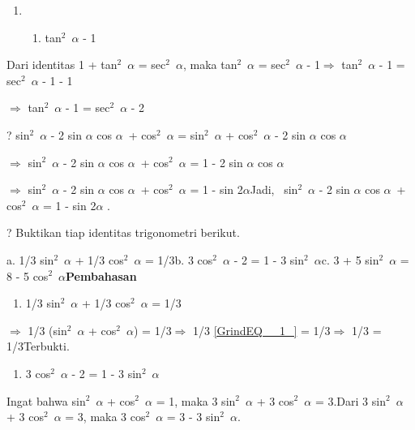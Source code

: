 \documentclass[11pt,fleqn]{book} %
\begin{document}
\begin{myEnumerate}
\begin{itemize}
\begin{enumerate}
\item \begin{enumerate}
\item  tan${}^{2}$~$\alpha$ - 1
\end{enumerate}
\end{enumerate}

\noindent Dari identitas 1 + tan${}^{2}$~$\alpha$ = sec${}^{2}$~$\alpha$, maka tan${}^{2}$~$\alpha$ = sec${}^{2}$~$\alpha$ - 1$\mathrm{\Rightarrow }$ tan${}^{2}$~$\alpha$ - 1 = sec${}^{2}$~$\alpha$ - 1 - 1

\noindent $\mathrm{\Rightarrow }$ tan${}^{2}$~$\alpha$ - 1 = sec${}^{2}$~$\alpha$ - 2 

\noindent ?  sin${}^{2}$~$\alpha$ - 2 sin $\alpha$ cos $\alpha$~+ cos${}^{2}$~$\alpha$ = sin${}^{2}$~$\alpha$ + cos${}^{2}$~$\alpha$ - 2 sin $\alpha$ cos $\alpha$

\noindent $\mathrm{\Rightarrow }$ sin${}^{2}$~$\alpha$ - 2 sin $\alpha$ cos $\alpha$~+ cos${}^{2}$~$\alpha$ = 1 - 2 sin $\alpha$ cos $\alpha$

\noindent $\mathrm{\Rightarrow }$ sin${}^{2}$~$\alpha$ - 2 sin $\alpha$ cos $\alpha$~+ cos${}^{2}$~$\alpha$ = 1 - sin 2$\alpha$Jadi,~ sin${}^{2}$~$\alpha$ - 2 sin $\alpha$ cos $\alpha$~+ cos${}^{2}$~$\alpha$ = 1 - sin 2$\alpha$ .

\noindent 

\noindent ?  Buktikan tiap identitas trigonometri berikut.

\noindent a. 1/3 sin${}^{2}$~$\alpha$ + 1/3 cos${}^{2}$~$\alpha$ = 1/3b. 3 cos${}^{2}$~$\alpha$ - 2 = 1 - 3 sin${}^{2}$~$\alpha$c. 3 + 5 sin${}^{2}$~$\alpha$ = 8 - 5 cos${}^{2}$~$\alpha$\textbf{Pembahasan}

\begin{enumerate}
\item  1/3 sin${}^{2}$~$\alpha$ + 1/3 cos${}^{2}$~$\alpha$ = 1/3
\end{enumerate}

\noindent $\mathrm{\Rightarrow }$ 1/3 (sin${}^{2}$~$\alpha$ + cos${}^{2}$~$\alpha$) = 1/3$\mathrm{\Rightarrow }$ 1/3 \eqref{GrindEQ__1_} = 1/3$\mathrm{\Rightarrow }$ 1/3 = 1/3Terbukti.

\begin{enumerate}
\item  3 cos${}^{2}$~$\alpha$ - 2 = 1 - 3 sin${}^{2}$~$\alpha$
\end{enumerate}

\noindent Ingat bahwa sin${}^{2}$~$\alpha$ + cos${}^{2}$~$\alpha$ = 1, maka 3 sin${}^{2}$~$\alpha$ + 3 cos${}^{2}$~$\alpha$ = 3.Dari 3 sin${}^{2}$~$\alpha$ + 3 cos${}^{2}$~$\alpha$ = 3, maka 3 cos${}^{2}$~$\alpha$ = 3 - 3 sin${}^{2}$~$\alpha$.


\end{itemize}
\end{myEnumerate}
\end{document}
